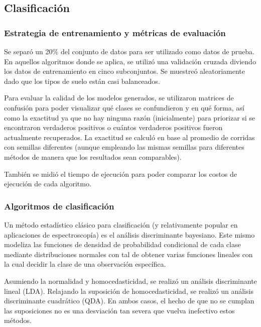 \documentclass[12pt]{article}
\begin{document}
\subsection{Clasificación}
\subsubsection{Estrategia de entrenamiento y métricas de evaluación}
Se separó un 20\% del conjunto de datos para ser utilizado como datos de prueba. En aquellos algoritmos donde se aplica, se utilizó una validación cruzada diviendo los datos de entrenamiento en cinco subconjuntos. Se muestreó aleatoriamente dado que los tipos de suelo están casi balanceados.

Para evaluar la calidad de los modelos generados, se utilizaron matrices de confusión para poder visualizar qué clases se confundieron y en qué forma, así como la exactitud ya que no hay ninguna razón (inicialmente) para priorizar si se encontraron verdaderos positivos o cuántos verdaderos positivos fueron actualmente recuperados. La exactitud se calculó en base al promedio de corridas con semillas diferentes (aunque empleando las mismas semillas para diferentes métodos de manera que los resultados sean comparables).

También se midió el tiempo de ejecución para poder comparar los costos de ejecución de cada algoritmo.
\subsubsection{Algoritmos de clasificación}
Un método estadístico clásico para clasificación (y relativamente popular en aplicaciones de espectroscopía) es el análisis discriminante bayesiano. Este mismo modeliza las funciones de densidad de probabilidad condicional de cada clase mediante distribuciones normales con tal de obtener varias funciones lineales con la cual decidir la clase de una observación específica. 

Asumiendo la normalidad y homocedasticidad, se realizó un análisis discriminante lineal (LDA). Relajando la suposición de homocedasticidad, se realizó un análisis discriminante cuadrático (QDA). En ambos casos, el hecho de que no se cumplan las suposiciones no es una desviación tan severa que vuelva inefectivo estos métodos. 

\end{document}
